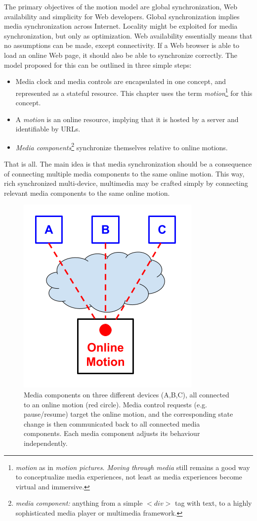 The primary objectives of the motion model are global synchronization, Web
availability and simplicity for Web developers. Global synchronization implies
media synchronization across Internet. Locality might be exploited for media
synchronization, but only as optimization. Web availability essentially means
that no assumptions can be made, except connectivity. If a Web browser is able
to load an online Web page, it should also be able to synchronize correctly.
The model proposed for this can be outlined in three simple steps:

\begin{itemize}
\item{Media clock and media controls are encapsulated in one concept, and
represented as a stateful resource. This chapter uses the term \emph{motion}\footnote{\emph{motion} as in \emph{motion pictures}. \emph{Moving through media} still remains a good way to conceptualize media experiences, not least as media experiences become virtual and immersive.
} for this
concept.} 
\item{A \emph{motion} is an online resource, implying that it is hosted by a
server and identifiable by URLs.}
\item{\emph{Media components}\footnote{\emph{media component:} anything from a simple $<div>$ tag with text, to a highly sophisticated media player or multimedia framework.
} synchronize themselves relative to online motions.}
\end{itemize}

That is all. The main idea is that media synchronization should be a
consequence of connecting multiple media components to the same online motion.
This way, rich synchronized multi-device, multimedia may be crafted simply by
connecting relevant media components to the same online motion.

\begin{figure}[h]
\centering
\includegraphics[scale=.4]{fig/motion-model.png}
\caption{Media components on three different devices (A,B,C), all connected to an online motion
(red circle). Media control requests (e.g. pause/resume) target the online
motion, and the corresponding state change is then
communicated back to all connected media components. Each media component
adjusts its behaviour independently.}
\label{fig:model}
\end{figure}

